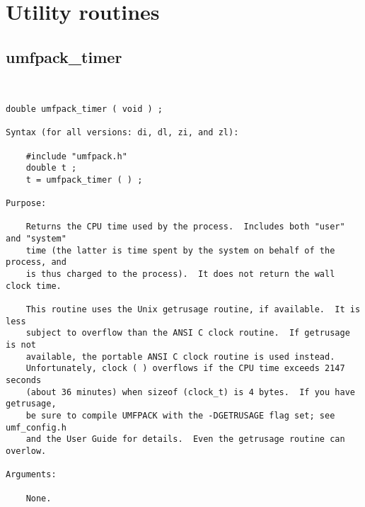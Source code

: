 \newpage
\section{Utility routines}
\label{Utility}

\subsection{umfpack\_timer}

{\footnotesize
\begin{verbatim}


double umfpack_timer ( void ) ;

Syntax (for all versions: di, dl, zi, and zl):

    #include "umfpack.h"
    double t ;
    t = umfpack_timer ( ) ;

Purpose:

    Returns the CPU time used by the process.  Includes both "user" and "system"
    time (the latter is time spent by the system on behalf of the process, and
    is thus charged to the process).  It does not return the wall clock time.

    This routine uses the Unix getrusage routine, if available.  It is less
    subject to overflow than the ANSI C clock routine.  If getrusage is not
    available, the portable ANSI C clock routine is used instead.
    Unfortunately, clock ( ) overflows if the CPU time exceeds 2147 seconds
    (about 36 minutes) when sizeof (clock_t) is 4 bytes.  If you have getrusage,
    be sure to compile UMFPACK with the -DGETRUSAGE flag set; see umf_config.h
    and the User Guide for details.  Even the getrusage routine can overlow.

Arguments:

    None.
\end{verbatim}
}

\newpage





